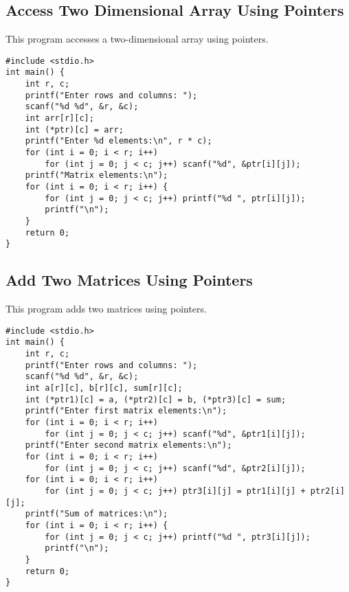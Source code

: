 \documentclass[a4paper,12pt]{article}
\begin{document}
\subsection{Access Two Dimensional Array Using Pointers}
This program accesses a two-dimensional array using pointers.
\begin{lstlisting}[caption={Access Two Dimensional Array Using Pointers}]
#include <stdio.h>
int main() {
    int r, c;
    printf("Enter rows and columns: ");
    scanf("%d %d", &r, &c);
    int arr[r][c];
    int (*ptr)[c] = arr;
    printf("Enter %d elements:\n", r * c);
    for (int i = 0; i < r; i++)
        for (int j = 0; j < c; j++) scanf("%d", &ptr[i][j]);
    printf("Matrix elements:\n");
    for (int i = 0; i < r; i++) {
        for (int j = 0; j < c; j++) printf("%d ", ptr[i][j]);
        printf("\n");
    }
    return 0;
}
\end{lstlisting}
\clearpage

\subsection{Add Two Matrices Using Pointers}
This program adds two matrices using pointers.
\begin{lstlisting}[caption={Add Two Matrices Using Pointers}]
#include <stdio.h>
int main() {
    int r, c;
    printf("Enter rows and columns: ");
    scanf("%d %d", &r, &c);
    int a[r][c], b[r][c], sum[r][c];
    int (*ptr1)[c] = a, (*ptr2)[c] = b, (*ptr3)[c] = sum;
    printf("Enter first matrix elements:\n");
    for (int i = 0; i < r; i++)
        for (int j = 0; j < c; j++) scanf("%d", &ptr1[i][j]);
    printf("Enter second matrix elements:\n");
    for (int i = 0; i < r; i++)
        for (int j = 0; j < c; j++) scanf("%d", &ptr2[i][j]);
    for (int i = 0; i < r; i++)
        for (int j = 0; j < c; j++) ptr3[i][j] = ptr1[i][j] + ptr2[i][j];
    printf("Sum of matrices:\n");
    for (int i = 0; i < r; i++) {
        for (int j = 0; j < c; j++) printf("%d ", ptr3[i][j]);
        printf("\n");
    }
    return 0;
}
\end{lstlisting}
\clearpage
\end{document}
